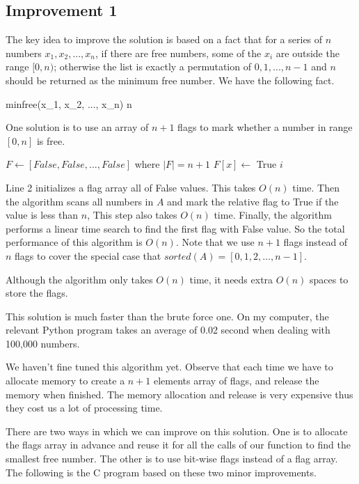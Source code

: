 \documentclass{article}
\begin{document}
\subsection{Improvement 1}
The key idea to improve the solution is based on a fact that for a
series of $n$ numbers $x_1, x_2, ..., x_n$, if there are free numbers,
some of the $x_i$ are outside the range $[0, n)$; otherwise the list is
exactly a permutation of $0, 1, ..., n-1$ and $n$ should be
returned as the minimum free number. We have the following fact.

\be
minfree(x_1, x_2, ..., x_n) \leq n
\label{min-free}
\ee

One solution is to use an array of $n+1$ flags to mark whether a number
in range $[0, n]$ is free.

\begin{algorithmic}[1]
  \State $F \gets [False, False, ..., False]$ where $|F| = n+1$
      \State $F[x] \gets$ True
    \EndIf
  \EndFor
      \State \Return $i$
    \EndIf
  \EndFor
\EndFunction
\end{algorithmic}

Line 2 initializes a flag array all of False values. This takes
$O(n)$ time. Then the algorithm scans all numbers in $A$ and mark
the relative flag to True if the value is less than $n$, This
step also takes $O(n)$ time. Finally, the algorithm performs a
linear time search to find the first flag with False value.
So the total performance of this algorithm is $O(n)$. Note that
we use $n+1$ flags instead of $n$ flags to cover the special case
that $sorted(A) = [0, 1, 2, ..., n-1]$.

Although the algorithm only takes $O(n)$ time, it needs extra
$O(n)$ spaces to store the flags.

This solution is much faster than the brute force one. On my
computer, the relevant Python program takes
an average of 0.02 second when dealing with 100,000 numbers.

We haven't fine tuned this algorithm yet. Observe that each time
we have to allocate memory to create a $n+1$ elements array of
flags, and release the memory when finished.
The memory allocation and release is very
expensive thus they cost us a lot of processing time.

There are two ways in which we can improve on
this solution. One is to allocate the flags array in advance
and reuse it for all the calls of our function to find the smallest free
number. The other is to use bit-wise flags instead of a flag
array. The following is the C program based on these two
minor improvements.
\end{document}
